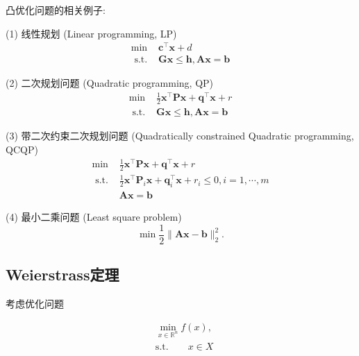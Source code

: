 \begin{example}凸优化问题的相关例子:
\par    (1) 线性规划 (Linear programming, LP)\cite{1963Linear}
    \begin{equation}
    \begin{array}{ll}
    \min & \bm{c}^{\top} \bm{x}+d \\
    \text { s.t. } & \bm{G} \bm{x} \leq \bm{h}, \bm{A} \bm{x}=\bm{b}
    \end{array}
        \nonumber
    \end{equation}
\par    (2) 二次规划问题 (Quadratic programming, QP)\cite{1995Sequential}
    \begin{equation}
    \begin{array}{ll}
    \min & \frac{1}{2} \bm{x}^{\top} \bm{P} \bm{x}+\bm{q}^{\top} \bm{x}+r \\
    \text { s.t. } & \bm{G} \bm{x} \leq \bm{h}, \bm{A} \bm{x}=\bm{b}
    \end{array}
        \nonumber
    \end{equation}
\par    (3) 带二次约束二次规划问题 (Quadratically constrained Quadratic programming, QCQP)\cite{1982Quadratically}
    \begin{equation}
    \begin{array}{ll}
    \min & \frac{1}{2} \bm{x}^{\top} \bm{P} \bm{x}+\bm{q}^{\top} \bm{x}+r \\
    \text { s.t. } & \frac{1}{2} \bm{x}^{\top} \bm{P}_{i} \bm{x}+\bm{q}_{i}^{\top} \bm{x}+r_{i} \leq 0, i=1, \cdots, m \\
    & \bm{A} \bm{x}=\bm{b}
    \end{array}
        \nonumber
    \end{equation}
\par (4) 最小二乘问题 (Least square problem)\cite{1989Least}
    \begin{equation}
    \min \frac{1}{2}\|\bm{A} \bm{x}-\bm{b}\|_{2}^{2} .
        \nonumber
    \end{equation}
\end{example}

\subsection{Weierstrass定理}
考虑优化问题

\begin{equation}
    \begin{split}
        &\mathop{\mathrm{min}}\limits_{x\in \mathbb{R}^{n}} f(x), \\
        &\mathrm{s. t.} \quad\quad x\in X
    \end{split}
\end{equation}

